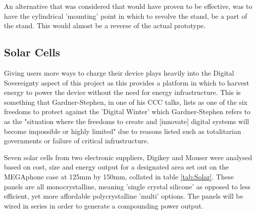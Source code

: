 An alternative that was considered that would have proven to be effective, was to have the cylindrical 'mounting' point in which to revolve the stand, be a part of the stand.
This would almost be a reverse of the actual prototype.

\subsection{Solar Cells}

Giving users more ways to charge their device plays heavily into the Digital Sovereignty aspect of this project as this provides a platform in which to harvest energy to power the device without the need for energy infrastructure.
This is something that Gardner-Stephen, in one of his CCC talks, lists as one of the six freedoms to protect against the 'Digital Winter' which Gardner-Stephen refers to as the "situation where the freedoms to create and [innovate] digital systems will become impossible or highly limited" due to reasons listed such as totalitarian governments or failure of critical infrustructure\cite{freedoms}.

Seven solar cells from two electronic suppliers, Digikey and Mouser were analysed based on cost, size and energy output for a designated area set out on the MEGAphone case at 125mm by 150mm, collated in table \ref{tab:Solar}.
These panels are all monocrystalline, meaning 'single crystal silicone' as opposed to less efficient, yet more affordable polycrystalline 'multi' options.
The panels will be wired in series in order to generate a compounding power output.

